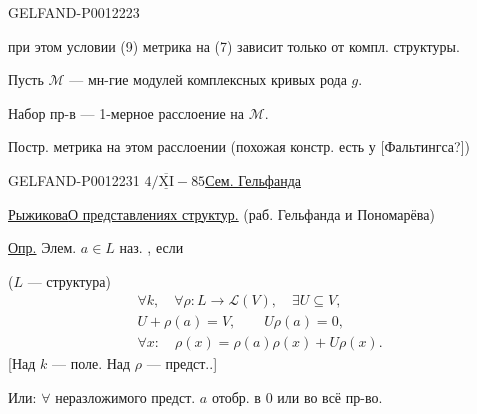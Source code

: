 \begin{GelfandAdjacentEvidence}{GELFAND-P001222}{3}


 при этом условии (9) метрика на (7) зависит только от компл. структуры.

Пусть \(\mathcal M\) --- мн-гие модулей комплексных кривых рода \(g\).

Набор пр-в --- 1-мерное расслоение на \(\mathcal M\).

Постр. метрика на этом расслоении (похожая констр. есть у [Фальтингса?])
\end{GelfandAdjacentEvidence}



\begin{GelfandAdjacentEvidence}{GELFAND-P001223}{1}
\(4/\overline{\underline{\mathrm{XI}}}-85\)\quad\underline{Сем. Гельфанда}

\underline{\underline{Рыжикова}}\quad\underline{О представлениях структур.}
(раб. Гельфанда и Пономарёва)

\underline{Опр.} Элем. \(a\in L\) наз. , если

(\(L\) --- структура)
\begin{equation*}
\begin{gathered}
\forall k,\quad\forall\rho:L\longrightarrow\mathcal L(V),\quad\exists U\subseteq V,\\
U+\rho(a)=V,\qquad U\rho(a)=0,\\
\forall x:\quad\rho(x)=\rho(a)\rho(x)+U\rho(x).
\end{gathered}
\end{equation*}
[Над \(k\) --- поле. Над \(\rho\) --- предст..]

Или: \(\forall\) неразложимого предст. \(a\) отобр. в \(0\) или во всё пр-во.
\end{GelfandAdjacentEvidence}
